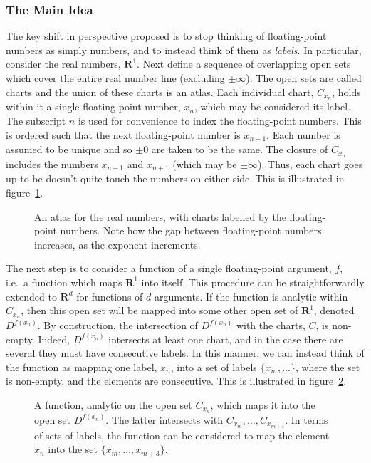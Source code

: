 \documentclass[prd,twocolumn,amsmath,amssymb,nofootinbib,eqsecnum]{revtex4-1}
\newcommand{\ie}{i.e.}
\newcommand{\fig}[1]{figure~\ref{fig:#1}}
\begin{document}
\subsubsection{The Main Idea}

The key shift in perspective proposed is to stop thinking of floating-point numbers as simply numbers, and to instead think of them as {\it labels}. In particular, consider the real numbers, $\mathbf{R}^1$. Next define a sequence of overlapping open sets which cover the entire real number line (excluding $\pm \infty$). The open sets are called charts and the union of these charts is an atlas. Each individual chart, $C_{x_n}$, holds within it a single floating-point number, $x_n$, which may be considered its label. The subscript $n$ is used for convenience to index the floating-point numbers. This is ordered such that the next floating-point number is $x_{n+1}$. Each number is assumed to be unique and so $\pm 0$ are taken to be the same. The closure of 
$C_{x_n}$ includes the numbers $x_{n-1}$ and $x_{n+1}$ (which may be $\pm \infty$). Thus, each chart goes up to be doesn't quite touch the numbers on either side. This is illustrated in \fig{R1}.

\begin{figure}[h]
\begin{center}
\resizebox{25em}{!}{}
\caption{An atlas for the real numbers, with charts labelled by the floating-point numbers. Note how the gap between floating-point numbers increases, as the exponent increments.}
\label{fig:R1}
\end{center}
\end{figure}

The next step is to consider a function of a single floating-point argument, $f$, \ie\ a function which maps $\mathbf{R}^1$ into itself. This procedure can be straightforwardly extended to $\mathbf{R}^d$ for functions of $d$ arguments. If the function is analytic within $C_{x_n}$, then this open set will be mapped into some other open set of $\mathbf{R}^1$, denoted $D^{f(x_n)}$. By construction, the intersection of $D^{f(x_n)}$ with the charts, $C$, is non-empty. Indeed, $D^{f(x_n)}$ intersects at least one chart, and in the case there are several they must have consecutive labels. In this manner, we can instead think of the function as mapping one label, $x_n$, into a set of labels $\{x_{m}, \ldots\}$, where the set is non-empty, and the elements are consecutive. This is illustrated in \fig{Function}.

\begin{figure}[h]
\begin{center}
\resizebox{25em}{!}{}
\caption{A function, analytic on the open set $C_{x_n}$, which maps it into the open set $D^{f(x_n)}$. The latter intersects with $C_{x_m}, \ldots, C_{x_{m+3}}$. In terms of sets of labels, the function can be considered to map the element $x_n$ into the set $\{x_m, \ldots, x_{m+3}\}$.}
\label{fig:Function}
\end{center}
\end{figure}
\end{document}
